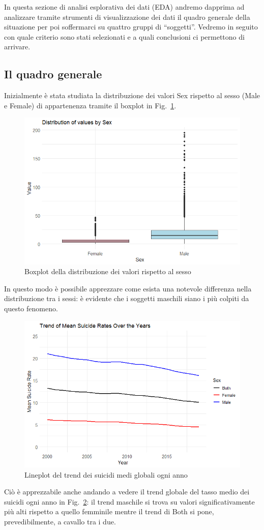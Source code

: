 \documentclass[conference]{IEEEtran}
\begin{document}
In questa sezione di analisi esplorativa dei dati (EDA) andremo dapprima
ad analizzare tramite strumenti di visualizzazione dei dati il quadro generale
della situazione per poi soffermarci su quattro gruppi di ``soggetti''.
Vedremo in seguito con quale criterio sono stati selezionati e a quali
conclusioni ci permettono di arrivare.

\subsection{Il quadro generale}

Inizialmente è stata studiata la distribuzione dei valori Sex rispetto
al sesso (Male e Female) di appartenenza tramite il boxplot in Fig.~\ref{1sex}.
\begin{figure}[htbp]
    \centerline{\includegraphics[width=.5\textwidth]{img/1 - Sex2.png}}
    \caption{Boxplot della distribuzione dei valori rispetto al sesso}
    \label{1sex}
\end{figure}
In questo modo è possibile apprezzare come esista una notevole differenza
nella distribuzione tra i sessi: è evidente che i soggetti maschili siano
i più colpiti da questo fenomeno.

\begin{figure}[htbp]
    \centerline{\includegraphics[width=.5\textwidth]{img/2 - Globtrend2.png}}
    \caption{Lineplot del trend dei suicidi medi globali ogni anno}
    \label{2globtrend}
\end{figure}
Ciò è apprezzabile anche andando a vedere il trend globale del
tasso medio dei suicidi ogni anno in Fig.~\ref{2globtrend}: il trend maschile
si trova su valori significativamente più alti rispetto a quello femminile mentre
il trend di Both si pone, prevedibilmente, a cavallo tra i due.
\end{document}
